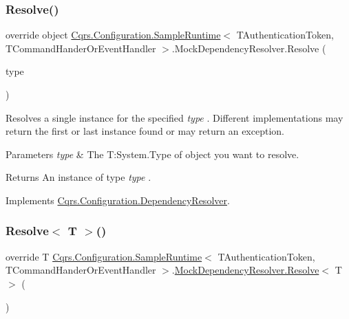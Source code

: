 \subsubsection{\texorpdfstring{Resolve()}{Resolve()}}
{\footnotesize\ttfamily override object \hyperlink{classCqrs_1_1Configuration_1_1SampleRuntime}{Cqrs.\+Configuration.\+Sample\+Runtime}$<$ T\+Authentication\+Token, T\+Command\+Hander\+Or\+Event\+Handler $>$.Mock\+Dependency\+Resolver.\+Resolve (\begin{DoxyParamCaption}\item[{Type}]{type }\end{DoxyParamCaption})\hspace{0.3cm}{\ttfamily [virtual]}}



Resolves a single instance for the specified {\itshape type} . Different implementations may return the first or last instance found or may return an exception. 


\begin{DoxyParams}{Parameters}
{\em type} & The T\+:\+System.\+Type of object you want to resolve.\\
\hline
\end{DoxyParams}
\begin{DoxyReturn}{Returns}
An instance of type {\itshape type} . 
\end{DoxyReturn}


Implements \hyperlink{classCqrs_1_1Configuration_1_1DependencyResolver_aaeeb3ad2e0ef44bd98469d843210205c_aaeeb3ad2e0ef44bd98469d843210205c}{Cqrs.\+Configuration.\+Dependency\+Resolver}.

\mbox{\label{classCqrs_1_1Configuration_1_1SampleRuntime_1_1MockDependencyResolver_a8f91ae00213bf65aa3349a7dcd82d24d_a8f91ae00213bf65aa3349a7dcd82d24d}} 
\subsubsection{\texorpdfstring{Resolve$<$ T $>$()}{Resolve< T >()}}
{\footnotesize\ttfamily override T \hyperlink{classCqrs_1_1Configuration_1_1SampleRuntime}{Cqrs.\+Configuration.\+Sample\+Runtime}$<$ T\+Authentication\+Token, T\+Command\+Hander\+Or\+Event\+Handler $>$.\hyperlink{classCqrs_1_1Configuration_1_1SampleRuntime_1_1MockDependencyResolver_ac4e52e995e2f8ff243d2af624d229461_ac4e52e995e2f8ff243d2af624d229461}{Mock\+Dependency\+Resolver.\+Resolve}$<$ T $>$ (\begin{DoxyParamCaption}{ }\end{DoxyParamCaption})\hspace{0.3cm}{\ttfamily [virtual]}}



